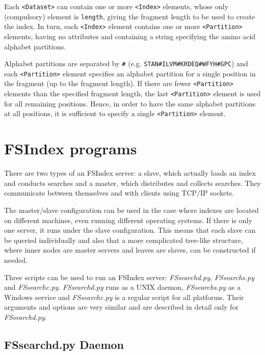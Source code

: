 \documentclass[11pt]{article}
\begin{document}
Each \texttt{<Dataset>} can contain one or more \texttt{<Index>} elements, whose only (compulsory) element is \texttt{length}, giving the fragment length to be used to create the index. In turn, each \texttt{<Index>} element contains one or more \texttt{<Partition>} elements, having no attributes and containing a string specifying the amino acid alphabet partitions.

Alphabet partitions are separated by \texttt{\#} (e.g. \texttt{STAN\#ILVM\#KRDEQ\#WFYH\#GPC}) and each \texttt{<Partition>} element specifies an alphabet partition for a single position in the fragment (up to the fragment length). If there are fewer \texttt{<Partition>} elements than the specified fragment length, the last \texttt{<Partition>} element is used for all remaining positions. Hence, in order to have the same alphabet partitions at all positions, it is sufficient to specify a single \texttt{<Partition>} element. 

\section{FSIndex programs}

There are two types of an FSIndex server: a slave, which actually loads an index and conducts searches and a master, which distributes and collects searches. They communicate between themselves and with clients using TCP/IP sockets.

The master/slave configuration can be used in the case where indexes are located on different machines, even running different operating systems. If there is only one server, it runs under the slave configuration. This means that each slave can be queried individually and also that a more complicated tree-like structure, where inner nodes are master servers and leaves are slaves, can be constructed if needed.

Three scripts can be used to run an FSIndex server: \textit{FSsearchd.py}, \textit{FSsearchs.py} and \textit{FSsearchc.py}. \textit{FSsearchd.py} runs as a UNIX daemon, \textit{FSsearchs.py} as a Windows service and \textit{FSsearchc.py} is a regular script for all platforms. Their arguments and options are very similar and are described in detail only for \textit{FSsearchd.py}.

\subsection{FSsearchd.py Daemon}\label{sec:FSdaemon}
\end{document}
